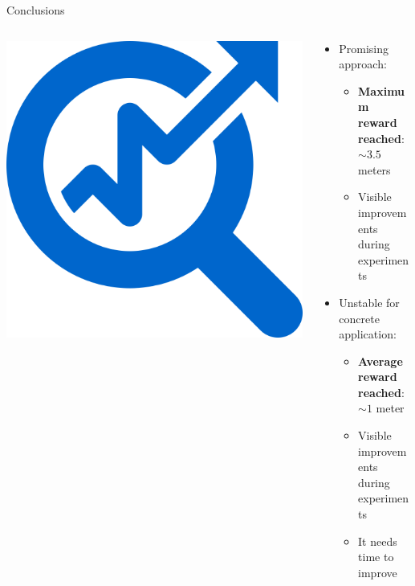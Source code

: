 \documentclass[aspectratio=169]{beamer}
\begin{document}
\begin{frame}{Conclusions}

	\begin{columns}
		\begin{column}{0.4\linewidth}
			\centering
			\includegraphics[width=0.6\linewidth]{img/conclusion.png}
		\end{column}
		\begin{column}{0.6\linewidth}
			\begin{itemize}[<+- | alert@+>]
				\item Promising approach:
				\begin{itemize}
					\item \textbf{Maximum reward reached}: $\sim 3.5$ meters
					\item Visible improvements during experiments
				\end{itemize}
				\item Unstable for concrete application:
				\begin{itemize}
				\item \textbf{Average reward reached}: $\sim 1$ meter
				\item Visible improvements during experiments
				\item It needs time to improve
				\end{itemize}
			\end{itemize}
		\end{column}
	\end{columns}
\end{frame}
\end{document}
